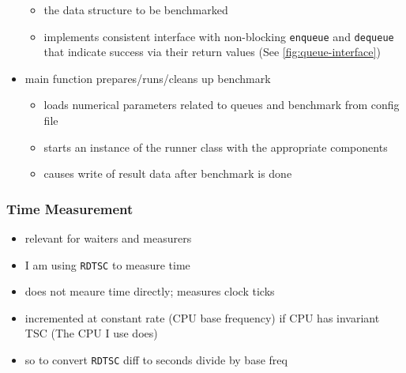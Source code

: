\begin{itemize}
\begin{itemize}
            \item the data structure to be benchmarked
            \item implements consistent interface with non-blocking \texttt{enqueue} and \texttt{dequeue}
                that indicate success via their return values (See \autoref{fig:queue-interface})
        \end{itemize}
    \item main function prepares/runs/cleans up benchmark
        \begin{itemize}
            \item loads numerical parameters related to queues and benchmark from config file
            \item starts an instance of the runner class with the appropriate components
            \item causes write of result data after benchmark is done
        \end{itemize}
\end{itemize}

\subsubsection{Time Measurement}
\begin{itemize}
    \item relevant for waiters and measurers
    \item I am using \texttt{RDTSC} to measure time
    \item does not meaure time directly; measures clock ticks
    \item incremented at constant rate (CPU base frequency) if CPU has invariant TSC (The CPU I use does)
    \item so to convert \texttt{RDTSC} diff to seconds divide by base freq
\end{itemize}

